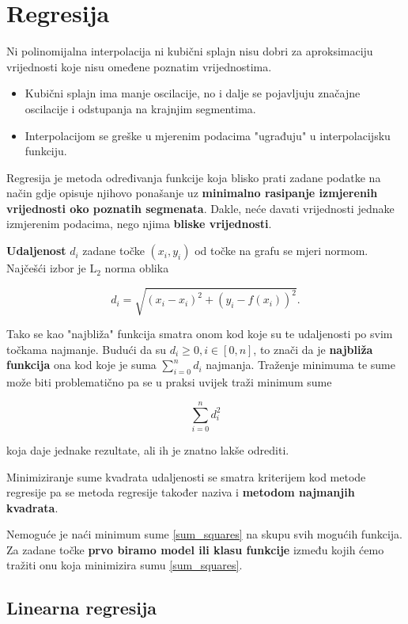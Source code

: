 
\section{Regresija}

Ni polinomijalna interpolacija ni kubični splajn nisu dobri za aproksimaciju vrijednosti koje nisu omeđene poznatim vrijednostima.
\begin{itemize}
    \item Kubični splajn ima manje oscilacije, no i dalje se pojavljuju značajne oscilacije i odstupanja na krajnjim segmentima.
    \item Interpolacijom se greške u mjerenim podacima "ugrađuju" u interpolacijsku funkciju.
\end{itemize}

Regresija je metoda određivanja funkcije koja blisko prati zadane podatke na način gdje opisuje njihovo ponašanje uz \textbf{minimalno rasipanje izmjerenih vrijednosti oko poznatih segmenata}. Dakle, neće davati vrijednosti jednake izmjerenim podacima, nego njima \textbf{bliske vrijednosti}.

\textbf{Udaljenost} $d_i$ zadane točke $(x_i, y_i)$ od točke na grafu se mjeri normom.
Najčešći izbor je $\mathrm{L}_2$ norma oblika

$$
d_i=\sqrt{(x_i-x_i)^2+(y_i-f(x_i))^2}.
$$

Tako se kao "najbliža" funkcija smatra onom kod koje su te udaljenosti po svim točkama najmanje. Budući da su $d_i\geq0, i\in[0,n]$, to znači da je \textbf{najbliža funkcija} ona kod koje je suma $\sum_{i=0}^nd_i$ najmanja.
Traženje minimuma te sume može biti problematično pa se u praksi uvijek traži minimum sume

\begin{equation}
    \label{sum_squares}
    \sum_{i=0}^nd_i^2
\end{equation}

koja daje jednake rezultate, ali ih je znatno lakše odrediti.

Minimiziranje sume kvadrata udaljenosti se smatra kriterijem kod metode regresije pa se metoda regresije također naziva i \textbf{metodom najmanjih kvadrata}.

Nemoguće je naći minimum sume \ref{sum_squares} na skupu svih mogućih funkcija. Za zadane točke \textbf{prvo biramo model ili klasu funkcije} između kojih ćemo tražiti onu koja minimizira sumu \ref{sum_squares}.

\subsection{Linearna regresija}

